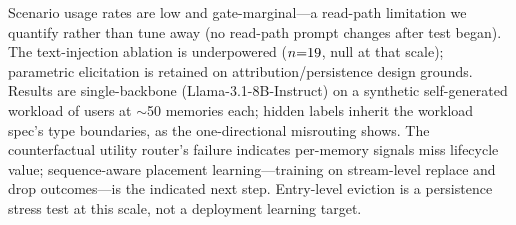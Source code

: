 \documentclass{article}
\begin{document}
Scenario usage rates are low and gate-marginal---a read-path limitation we quantify rather than tune away (no read-path prompt changes after test began). The text-injection ablation is underpowered ($n{=}19$, null at that scale); parametric elicitation is retained on attribution/persistence design grounds. Results are single-backbone (Llama-3.1-8B-Instruct) on a synthetic self-generated workload of \TestUsers{} users at $\sim$50 memories each; hidden labels inherit the workload spec's type boundaries, as the one-directional misrouting shows. The counterfactual utility router's failure indicates per-memory signals miss lifecycle value; sequence-aware placement learning---training on stream-level replace and drop outcomes---is the indicated next step. Entry-level eviction is a persistence stress test at this scale, not a deployment learning target.


\FloatBarrier
\clearpage




\appendix


\end{document}
